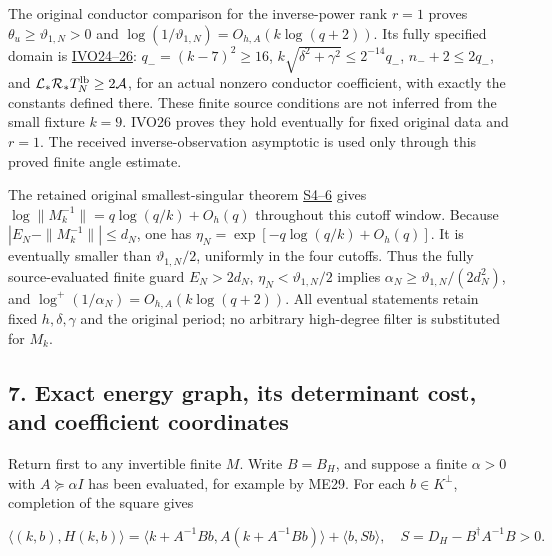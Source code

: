 \documentclass[11pt]{article}
\begin{document}
The original conductor comparison for the inverse-power rank \(r=1\) proves \(\theta_u\ge\vartheta_{1,N}>0\) and \(\log(1/\vartheta_{1,N})=O_{h,A}(k\log(q+2))\). Its fully specified domain is \href{https://github.com/KokunoYumeto/zeta-function-research-reader/blob/edd4008690952fb8568a01744e49ad7e180401e9/workbenches/splitzero-tandem/continuations/20260921-original-observation/INDEPENDENT_FINITE_OBSERVATION.tex\#L258}{IVO24--26}: \(q_-=(k-7)^2\ge16\), \(k\sqrt{\delta^2+\gamma^2}\le2^{-14}q_-\), \(n_-+2\le2q_-\), and \(\mathcal L_*\mathcal R_*T_N^{\rm lb}\ge2\mathcal A\), for an actual nonzero conductor coefficient, with exactly the constants defined there. These finite source conditions are not inferred from the small fixture \(k=9\). IVO26 proves they hold eventually for fixed original data and \(r=1\). The received inverse-observation asymptotic is used only through this proved finite angle estimate.

The retained original smallest-singular theorem \href{https://github.com/KokunoYumeto/zeta-function-research-reader/blob/edd4008690952fb8568a01744e49ad7e180401e9/workbenches/splitzero-tandem/continuations/20260921-original-observation/NATIVE_SMALLEST_SINGULAR_PROOF.tex\#L40}{S4--6} gives \(\log\|M_k^{-1}\|=q\log(q/k)+O_h(q)\) throughout this cutoff window. Because \(|E_N-\|M_k^{-1}\||\le d_N\), one has \(\eta_N=\exp[-q\log(q/k)+O_h(q)]\). It is eventually smaller than \(\vartheta_{1,N}/2\), uniformly in the four cutoffs. Thus the fully source-evaluated finite guard \(E_N>2d_N\), \(\eta_N<\vartheta_{1,N}/2\) implies \(\alpha_N\ge\vartheta_{1,N}/(2d_N^2)\), and \(\log^+(1/\alpha_N)=O_{h,A}(k\log(q+2))\). All eventual statements retain fixed \(h,\delta,\gamma\) and the original period; no arbitrary high-degree filter is substituted for \(M_k\).

\subsection{7. Exact energy graph, its determinant cost, and coefficient coordinates}\label{exact-energy-graph-its-determinant-cost-and-coefficient-coordinates}

Return first to any invertible finite \(M\). Write \(B=B_H\), and suppose a finite \(\alpha>0\) with \(A\succeq\alpha I\) has been evaluated, for example by ME29. For each \(b\in K^\perp\), completion of the square gives

\[
\langle(k,b),H(k,b)\rangle
=\langle k+A^{-1}Bb,A(k+A^{-1}Bb)\rangle+\langle b,Sb\rangle,
\quad S=D_H-B^\dagger A^{-1}B>0.
\tag{ME30}
\]
\end{document}
